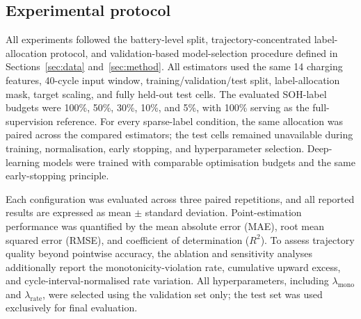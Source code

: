 \subsection{Experimental protocol}
\label{subsec:experimental_setup}

All experiments followed the battery-level split, trajectory-concentrated label-allocation protocol, and validation-based model-selection procedure defined in Sections~\ref{sec:data} and~\ref{sec:method}. All estimators used the same 14 charging features, 40-cycle input window, training/validation/test split, label-allocation mask, target scaling, and fully held-out test cells. The evaluated SOH-label budgets were 100\%, 50\%, 30\%, 10\%, and 5\%, with 100\% serving as the full-supervision reference. For every sparse-label condition, the same allocation was paired across the compared estimators; the test cells remained unavailable during training, normalisation, early stopping, and hyperparameter selection. Deep-learning models were trained with comparable optimisation budgets and the same early-stopping principle.

Each configuration was evaluated across three paired repetitions, and all reported results are expressed as mean $\pm$ standard deviation. Point-estimation performance was quantified by the mean absolute error (MAE), root mean squared error (RMSE), and coefficient of determination ($R^2$). To assess trajectory quality beyond pointwise accuracy, the ablation and sensitivity analyses additionally report the monotonicity-violation rate, cumulative upward excess, and cycle-interval-normalised rate variation. All hyperparameters, including $\lambda_{\mathrm{mono}}$ and $\lambda_{\mathrm{rate}}$, were selected using the validation set only; the test set was used exclusively for final evaluation.
